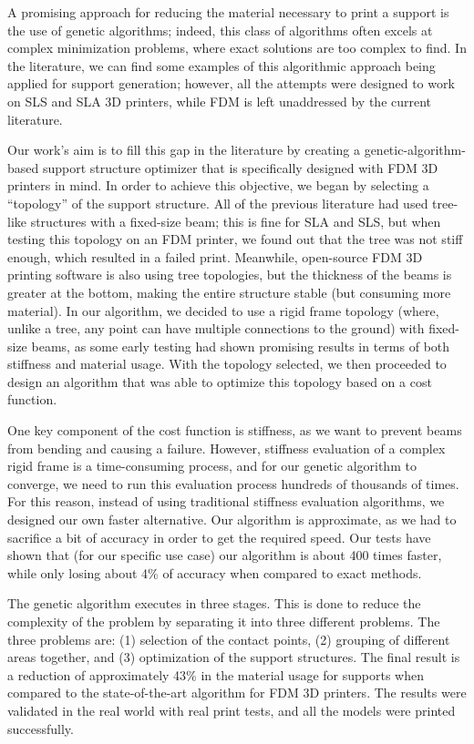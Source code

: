 A promising approach for reducing the material necessary to print a support is the use of
genetic algorithms; indeed, this class of algorithms often excels at complex minimization
problems, where exact solutions are too complex to find. In the literature, we can find
some examples of this algorithmic approach being applied for support generation;
however, all the attempts were designed to work on SLS and SLA 3D printers,
while FDM is left unaddressed by the current literature.

Our work's aim is to fill this gap in the literature by creating a genetic-algorithm-based support structure optimizer that is specifically designed with FDM 3D printers
in mind. In order to achieve this objective, we began by selecting a ``topology'' of the support
structure. All of the previous literature had used tree-like structures with a fixed-size
beam; this is fine for SLA and SLS, but when testing this topology on an FDM printer, 
we found out that the tree was not stiff enough, which resulted in a failed print.
Meanwhile, open-source FDM 3D printing software is also using tree topologies,
but the thickness of the beams is greater at the bottom, making the entire structure
stable (but consuming more material).
In our algorithm, we decided to use a rigid frame topology (where, unlike a tree,
any point can have multiple connections to the ground) with fixed-size beams,
as some early testing had shown promising results in terms of both stiffness and
 material usage.
With the topology selected, we then proceeded to design an algorithm that was able to
optimize this topology based on a cost function.

One key component of the cost function is stiffness, as we want to prevent beams from bending and causing
a failure. However, stiffness evaluation of a complex rigid frame is a time-consuming process, and
for our genetic algorithm to converge, we need to run this evaluation process hundreds of thousands
of times. For this reason, instead of using traditional stiffness evaluation algorithms, we designed
our own faster alternative. Our algorithm is approximate, as we had to sacrifice a bit of
accuracy in order to get the required speed. Our tests have shown that (for our specific use case)
our algorithm is about 400 times faster, while only losing about 4\% of accuracy when compared
to exact methods.

The genetic algorithm executes in three stages. This is done to reduce
the complexity of the problem by separating it into three different problems.
The three problems are: (1) selection of the contact points,
(2) grouping of different areas together, and (3) optimization of the support structures.
The final result is a reduction of approximately 43\% in the material usage
for supports when compared to the state-of-the-art algorithm for FDM 3D printers.
The results were validated in the real world with real print tests, and all the
models were printed successfully.

